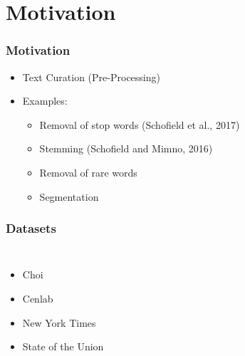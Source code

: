 \documentclass{beamer}
\begin{document}
    \section{Motivation}
    \begin{frame}
        \frametitle{Motivation}
        \begin{itemize}
            \item Text Curation (Pre-Processing)
            \item Examples:
            \begin{itemize}
                \item Removal of stop words (Schofield et al., 2017)
                \item Stemming (Schofield and Mimno, 2016)
                \item Removal of rare words
                \item Segmentation
            \end{itemize}
        \end{itemize}
    \end{frame}

    \begin{frame}
        \frametitle{Datasets}
        \begin{columns}
            \begin{itemize}
                \item Choi
                \item Cenlab
                \item New York Times
                \item State of the Union
            \end{itemize}
            \begin{table}[t]
                \centering
                \label{tab:corpora}
            \end{table}
        \end{columns}
    \end{frame}
\end{document}
